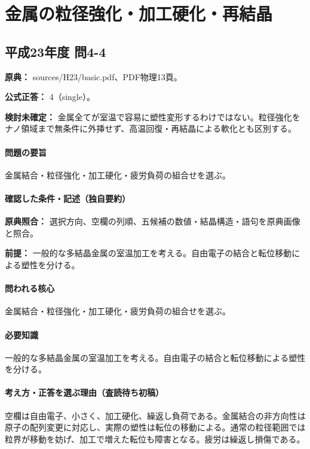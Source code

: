 \section{金属の粒径強化・加工硬化・再結晶}

\subsection{平成23年度 問4-4}
\label{q:h23-reg-basic-4-4}

\noindent\textbf{原典：} sources/H23/basic.pdf、PDF物理13頁。

\textbf{公式正答：} 4（single）。

\par\textbf{検討未確定：} 金属全てが室温で容易に塑性変形するわけではない。粒径強化をナノ領域まで無条件に外挿せず、高温回復・再結晶による軟化とも区別する。

\paragraph{問題の要旨} 金属結合・粒径強化・加工硬化・疲労負荷の組合せを選ぶ。

\paragraph{確認した条件・記述（独自要約）}\mbox{}\par

\noindent\textbf{原典照合：} 選択方向、空欄の列順、五候補の数値・結晶構造・語句を原典画像と照合。\par

\noindent\textbf{前提：} 一般的な多結晶金属の室温加工を考える。自由電子の結合と転位移動による塑性を分ける。\par

\paragraph{問われる核心} 金属結合・粒径強化・加工硬化・疲労負荷の組合せを選ぶ。

\paragraph{必要知識} 一般的な多結晶金属の室温加工を考える。自由電子の結合と転位移動による塑性を分ける。

\paragraph{考え方・正答を選ぶ理由（査読待ち初稿）} 空欄は自由電子、小さく、加工硬化、繰返し負荷である。金属結合の非方向性は原子の配列変更に対応し、実際の塑性は転位の移動による。通常の粒径範囲では粒界が移動を妨げ、加工で増えた転位も障害となる。疲労は繰返し損傷である。

